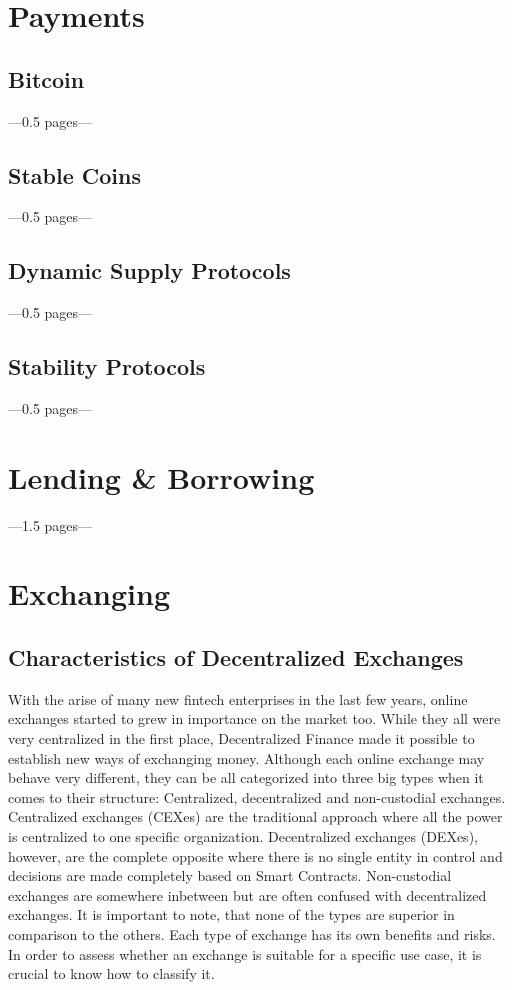 \section{Payments}
\subsection{Bitcoin}
---0.5 pages---
\subsection{Stable Coins}
---0.5 pages---
\subsection{Dynamic Supply Protocols}
---0.5 pages---
\subsection{Stability Protocols}
---0.5 pages---

\section{Lending \& Borrowing}
---1.5 pages---

\section{Exchanging}
\subsection{Characteristics of Decentralized Exchanges}
With the arise of many new fintech enterprises in the last few years, online exchanges started to grew in importance on the market too. While they all were very centralized in the first place, Decentralized Finance made it possible to establish new ways of exchanging money. Although each online exchange may behave very different, they can be all categorized into three big types when it comes to their structure: Centralized, decentralized and non-custodial exchanges. Centralized exchanges (CEXes) are the traditional approach where all the power is centralized to one specific organization. Decentralized exchanges (DEXes), however, are the complete opposite where there is no single entity in control and decisions are made completely based on Smart Contracts. Non-custodial exchanges are somewhere inbetween but are often confused with decentralized exchanges. It is important to note, that none of the types are superior in comparison to the others. Each type of exchange has its own benefits and risks. In order to assess whether an exchange is suitable for a specific use case, it is crucial to know how to classify it.

